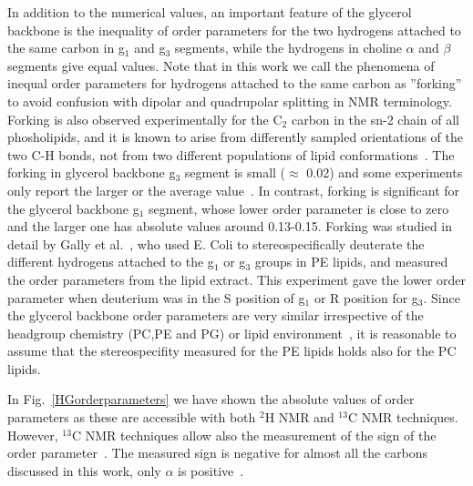 \documentclass[pre,aps,floatfix,authordate1-4,twocolumn]{revtex4-1}
\begin{document}
In addition to the numerical values, an important feature of the glycerol backbone is the 
inequality of order parameters for the two hydrogens attached to the same carbon in g$_1$ and g$_3$ segments,
while the hydrogens in choline $\alpha$ and $\beta$ segments give equal values.
Note that in this work we call the phenomena of inequal order parameters for hydrogens attached to the same carbon as ''forking'' to avoid 
confusion with dipolar and quadrupolar splitting in NMR terminology. Forking is also observed experimentally for the C$_2$ carbon in the sn-2
chain of all phosholipids, and it is known to arise from differently sampled orientations of the two C-H bonds, not from two 
different populations of lipid conformations~\cite{engel81}. The forking in glycerol backbone g$_3$ segment is small ($\approx$ 0.02) 
and some experiments only report the larger or the average value~\cite{akutsu81,ferreira13}. 
In contrast, forking is significant for the glycerol backbone g$_1$ segment, whose lower order parameter is close to zero and the
larger one has absolute values around 0.13-0.15. Forking was studied in detail by Gally et al.~\cite{gally81}, who used E. Coli to 
stereospecifically deuterate the different hydrogens attached to the g$_1$ or g$_3$ groups in PE lipids, and measured the order parameters from the lipid 
extract. This experiment gave the lower order parameter when deuterium was in the S position of g$_1$ or R position for g$_3$.
Since the glycerol backbone order parameters are very similar irrespective of the headgroup chemistry (PC,PE and PG) or lipid 
environment~\cite{gally81}, it is reasonable to assume that the stereospecifity measured for the PE lipids
holds also for the PC lipids.

In Fig.~\ref{HGorderparameters} we have shown the absolute values of order parameters as these are accessible
with both $^2$H NMR and $^{13}$C NMR techniques. However, $^{13}$C NMR techniques allow also the measurement of 
the sign of the order parameter~\cite{hong95a,hong95b,gross97}. The measured sign is negative for almost all the carbons 
discussed in this work, only $\alpha$ is positive~\cite{hong95a,hong95b,gross97}. 
\end{document}
